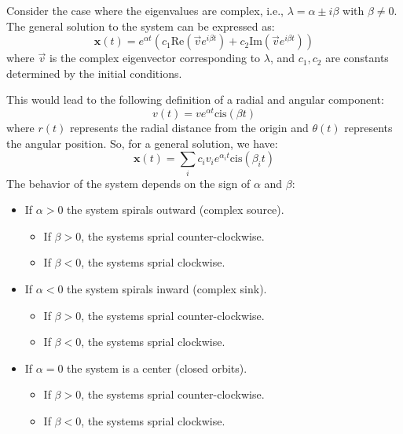 \documentclass[11pt]{article}
\begin{document}
\begin{definition}
    Consider the case where the eigenvalues are complex, i.e., \( \lambda = \alpha \pm i\beta \) with \( \beta \neq 0 \). The general solution to the system can be expressed as:
    $$\textbf{x}(t) = e^{\alpha t} \left( c_1 \text{Re}(\vec{v} e^{i\beta t}) + c_2 \text{Im}(\vec{v} e^{i\beta t}) \right)$$
    where \( \vec{v} \) is the complex eigenvector corresponding to \( \lambda \), and \( c_1, c_2 \) are constants determined by the initial conditions.

    This would lead to the following definition of a radial and angular component:
    \begin{equation}
    v(t) = ve^{\alpha t} \mathrm{cis} (\beta t)
    \end{equation}
    where \( r(t) \) represents the radial distance from the origin and \( \theta(t) \) represents the angular position. So, for a general solution, we have:
    \begin{equation}
    \textbf{x}(t) = \sum_i c_i v_i e^{\alpha_i t} \mathrm{cis} (\beta_i t)
    \end{equation}
    The behavior of the system depends on the sign of \( \alpha \) and $\beta$:
    \begin{itemize}
        \item If \( \alpha > 0 \) the system spirals outward (complex source).
        \begin{itemize}
            \item If \( \beta > 0 \), the systems sprial counter-clockwise.
            \item If \( \beta < 0 \), the systems sprial clockwise.
        \end{itemize}
        \item If \( \alpha < 0 \) the system spirals inward (complex sink).
        \begin{itemize}
            \item If \( \beta > 0 \), the systems sprial counter-clockwise.
            \item If \( \beta < 0 \), the systems sprial clockwise.
        \end{itemize}
        \item If \( \alpha = 0 \) the system is a center (closed orbits).
        \begin{itemize}
            \item If \( \beta > 0 \), the systems sprial counter-clockwise.
            \item If \( \beta < 0 \), the systems sprial clockwise.       
        \end{itemize}
    \end{itemize}
\end{definition}
\end{document}
